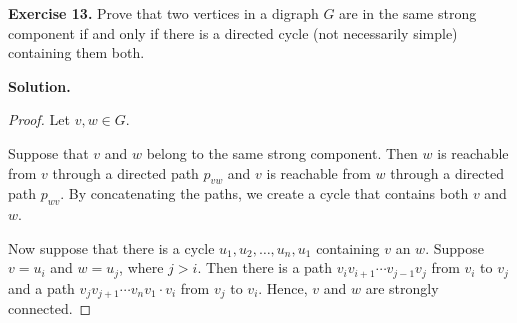 \documentclass[12pt, a4paper]{article}
\newenvironment{ex}[2][Exercise]
{\par\medskip\noindent \textbf{#1 #2.}}
{\medskip}
\newenvironment{sol}[1][Solution]
{\par\medskip\noindent \textbf{#1.} }
{\medskip}
\begin{document}
	\begin{ex}{13}
		Prove that two vertices in a digraph $G$ are in the same strong component
		if and only if there is a directed cycle (not necessarily simple) containing
		them both.
	\end{ex}
	\begin{sol}
		\begin{proof}
			Let $v,w\in G$.
			
			Suppose that $v$ and $w$ belong to the same strong component. Then $w$
			is reachable from $v$ through a directed path $p_{vw}$ and $v$ is reachable
			from $w$ through a directed path $p_{wv}$. By concatenating the paths, we
			create a cycle that contains both $v$ and $w$.
			
			Now suppose that there is a cycle $u_1,u_2,\ldots,u_n,u_1$ containing
			$v$ an $w$. Suppose $v=u_i$ and $w=u_j$, where $j>i$. Then there is a path
			$v_iv_{i+1}\cdots v_{j-1}v_j$ from $v_i$ to $v_j$ and a path
			$v_jv_{j+1}\cdots v_nv_1\cdot v_i$ from $v_j$ to $v_i$. Hence,
			$v$ and $w$ are strongly connected.
		\end{proof}
	\end{sol}
	
	\pagebreak
	\printbibliography
\end{document}

